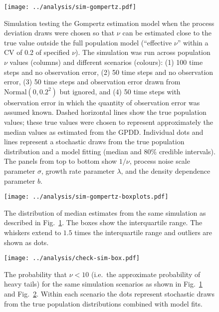 \clearpage

\begin{figure}[htbp]
\begin{center}
\texttt{[image: ../analysis/sim-gompertz.pdf]}
\caption{
  Simulation testing the Gompertz estimation model when the process deviation
  draws were chosen so that $\nu$ can be estimated close to the true value
  outside the full population model (``effective $\nu$'' within a CV of 0.2 of
  specified $\nu$). The simulation was run across population $\nu$ values
  (columns) and different scenarios (colours): (1) 100 time steps and no
  observation error, (2) 50 time steps and no observation error, (3) 50 time
  steps and observation error drawn from $\mathrm{Normal} (0, 0.2^2)$ but
  ignored, and (4) 50 time steps with observation error in which the quantity
  of observation error was assumed known. Dashed horizontal lines show the true
  population values; these true values were chosen to represent approximately
  the median values as estimated from the GPDD. Individual dots and lines
  represent a stochastic draws from the true population distribution and
  a model fitting (median and 80\% credible intervals). The panels from top to
  bottom show $1/\nu$, process noise scale parameter $\sigma$, growth rate
  parameter $\lambda$, and the density dependence parameter $b$.
}
\label{fig:sim-gompertz}
\end{center}
\end{figure}

\begin{figure}[htbp]
\begin{center}
\texttt{[image: ../analysis/sim-gompertz-boxplots.pdf]}
\caption{
  The distribution of median estimates from the same simulation as described in
  Fig.~\ref{fig:sim-gompertz}. The boxes show the interquartile range. The
  whiskers extend to $1.5$ times the interquartile range and outliers are shown
  as dots.
}
\label{fig:sim-gompertz-boxplots}
\end{center}
\end{figure}


\begin{figure}[htbp]
\begin{center}
\texttt{[image: ../analysis/check-sim-box.pdf]}
\caption{
  The probability that $\nu < 10$ (i.e.\ the approximate probability of heavy
  tails) for the same simulation scenarios as shown in
  Fig.~\ref{fig:sim-gompertz} and Fig.~\ref{fig:sim-gompertz-boxplots}. Within
  each scenario the dots represent stochastic draws from the true population
  distributions combined with model fits.
}
\label{fig:sim-prob}
\end{center}
\end{figure}


